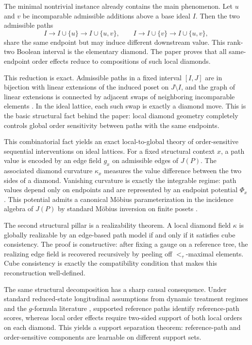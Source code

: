 \documentclass{article}
\theoremstyle{definition}
\begin{document}
The minimal nontrivial instance already contains the main phenomenon. Let \(u\) and \(v\) be incomparable admissible additions above a base ideal \(I\). Then the two admissible paths
\[
I\to I\cup\{u\}\to I\cup\{u,v\},
\qquad
I\to I\cup\{v\}\to I\cup\{u,v\},
\]
share the same endpoint but may induce different downstream value. This rank-two Boolean interval is the elementary {diamond}. The paper proves that all same-endpoint order effects reduce to compositions of such local diamonds.

This reduction is exact. Admissible paths in a fixed interval \([I,J]\) are in bijection with linear extensions of the induced poset on \(J\setminus I\), and the graph of linear extensions is connected by adjacent swaps of neighboring incomparable elements \cite{trotter1992,pruesse1994,stanley2011ec1}. In the ideal lattice, each such swap is exactly a diamond move. This is the basic structural fact behind the paper: local diamond geometry completely controls global order sensitivity between paths with the same endpoints.

This combinatorial fact yields an exact local-to-global theory of order-sensitive sequential interventions on ideal lattices. For a fixed structural context \(x\), a path value is encoded by an edge field \(g_x\) on admissible edges of \(J(P)\). The associated {diamond curvature} \(\kappa_x\) measures the value difference between the two sides of a diamond. Vanishing curvature is exactly the integrable regime: path values depend only on endpoints and are represented by an endpoint potential \(\Phi_x\). This potential admits a canonical M\"obius parameterization in the incidence algebra of \(J(P)\) by standard M\"obius inversion on finite posets \cite{rota1964,stanley2011ec1}.

The second structural pillar is a realizability theorem. A local diamond field \(\kappa\) is globally realizable by an edge-based path model if and only if it satisfies cube consistency. The proof is constructive: after fixing a gauge on a reference tree, the realizing edge field is recovered recursively by peeling off \(<_{\tau}\)-maximal elements. Cube consistency is exactly the compatibility condition that makes this reconstruction well-defined.

The same structural decomposition has a sharp causal consequence. Under standard reduced-state longitudinal assumptions from dynamic treatment regimes and the \(g\)-formula literature \cite{robins1986,robins1987,murphy2003,murphy2005,hernanrobins2020}, supported reference paths identify reference-path scores, whereas local order effects require two-sided support of both local orders on each diamond. This yields a {support separation} theorem: reference-path and order-sensitive components are learnable on different support sets.
\end{document}
